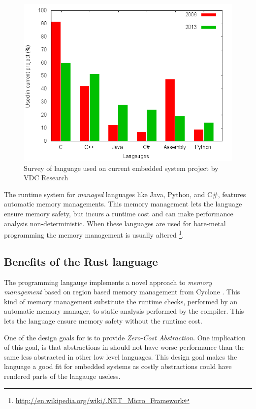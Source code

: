 \begin{figure}[H]
  \begin{center}
    \includegraphics[scale=0.5]{figures/plots/langs.png}
  \end{center}
  \caption{Survey of language used on current embedded system project by VDC Research}
  \label{fig:vdc:langs}
\end{figure}

The runtime system for \emph{managed} languages like Java, Python, and C\#, features automatic memory managements.
This memory management lets the language ensure memory safety, but incurs a runtime cost and can make performance analysis non-deterministic.
When these languages are used for bare-metal programming the memory management is usually altered \cite{PetitBianco} \cite{Pizlo} \footnote{\url{http://en.wikipedia.org/wiki/.NET_Micro_Framework}}.

\subsection{Benefits of the Rust language}
The {\rust} programming langauge implements a novel approach to \emph{memory management} based on region based memory management from Cyclone \cite{Grossman2002,Swamy2006}.
This kind of memory management substitute the runtime checks, performed by an automatic memory manager, to static analysis performed by the compiler.
This lets the {\rust} language ensure memory safety without the runtime cost.

One of the design goals for {\rust} is to provide \emph{Zero-Cost Abstraction}.
One implication of this goal, is that abstractions in {\rust} should not have worse performance than the same less abstracted in other low level languages.
This design goal makes the language a good fit for embedded systems as costly abstractions could have rendered parts of the langauge useless.

